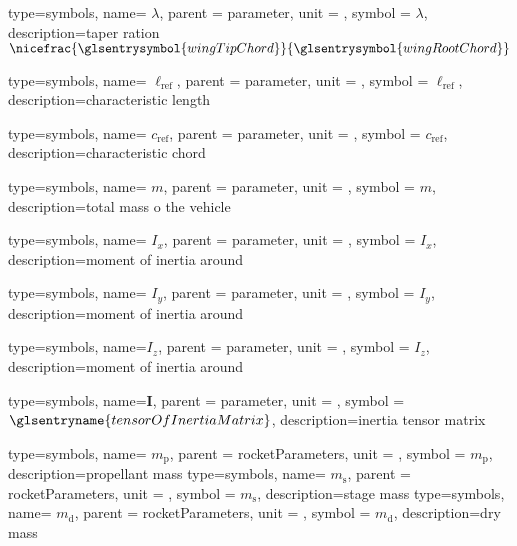 {type=symbols,
  name= \ensuremath{\lambda},
  parent = {parameter},
  unit = \unexpanded{},
  symbol = \ensuremath{\lambda},
  description={taper ration $\nicefrac{\glsentrysymbol{wingTipChord}}{\glsentrysymbol{wingRootChord}}$}
}

{type=symbols,
  name= \ensuremath{\ell_{\text{ref}}},
  parent = {parameter},
  unit = \unexpanded{\si{\meter}},
  symbol = \ensuremath{\ell_{\text{ref}}},
  description={characteristic length}
}

{type=symbols,
  name= \ensuremath{c_{\text{ref}}},
  parent = {parameter},
  unit = \unexpanded{\si{\meter}},
  symbol = \ensuremath{c_{\text{ref}}},
  description={characteristic chord}
}


{type=symbols,
  name= \ensuremath{m},
  parent = {parameter},
  unit = \unexpanded{\si{\kilogram}},
  symbol = \ensuremath{m},
  description={total mass o the vehicle}
}

{type=symbols,
  name= \ensuremath{I_{x}},
  parent = {parameter},
  unit = \unexpanded{\si{\kilogram\meter\squared}},
  symbol = \ensuremath{I_{x}},
  description={moment of inertia around }
}


{type=symbols,
  name= \ensuremath{I_{y}},
  parent = {parameter},
  unit = \unexpanded{\si{\kilogram\meter\squared}},
  symbol = \ensuremath{I_{y}},
  description={moment of inertia around }
}

{type=symbols,
  name=\ensuremath{I_{z}},
  parent = {parameter},
  unit = \unexpanded{\si{\kilogram\meter\squared}},
  symbol = \ensuremath{I_{z}},
  description={moment of inertia around }
}


{type=symbols,
  name=\ensuremath{\mathbf{I}},
  parent = {parameter},
  unit = \unexpanded{\si{\kilogram\meter\squared}},
  symbol = \ensuremath{\glsentryname{tensorOfInertiaMatrix}},
  description={inertia tensor matrix}
}

{type=symbols,
  name= \ensuremath{m_\mathrm{p}},
  parent = {rocketParameters},
  unit = \unexpanded{\si{\kilogram}},
  symbol = \ensuremath{m_\mathrm{p}},
  description={propellant mass}
}
{type=symbols,
  name= \ensuremath{m_\mathrm{s}},
  parent = {rocketParameters},
  unit = \unexpanded{\si{\kilogram}},
  symbol = \ensuremath{m_\mathrm{s}},
  description={stage mass}
}
{type=symbols,
  name= \ensuremath{{m}_\mathrm{d}},
  parent = {rocketParameters},
  unit = \unexpanded{\si{\kilogram}},
  symbol = \ensuremath{{m}_\mathrm{d}},
  description={dry mass}
}

